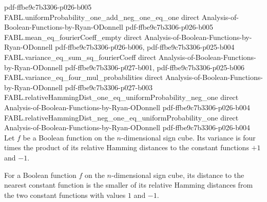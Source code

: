 \begin{theorem}
  {pdf-ffbe9c7b3306-p026-b005}
\proofstep
  {FABL.uniformProbability_one_add_neg_one_eq_one}
  {direct}
  {Analysis-of-Boolean-Functions-by-Ryan-ODonnell}
  {pdf-ffbe9c7b3306-p026-b005}
\proofstep
  {FABL.mean_eq_fourierCoeff_empty}
  {direct}
  {Analysis-of-Boolean-Functions-by-Ryan-ODonnell}
  {pdf-ffbe9c7b3306-p026-b006,
    pdf-ffbe9c7b3306-p025-b004}
\proofstep
  {FABL.variance_eq_sum_sq_fourierCoeff}
  {direct}
  {Analysis-of-Boolean-Functions-by-Ryan-ODonnell}
  {pdf-ffbe9c7b3306-p027-b001,
    pdf-ffbe9c7b3306-p025-b006}
\proofstep
  {FABL.variance_eq_four_mul_probabilities}
  {direct}
  {Analysis-of-Boolean-Functions-by-Ryan-ODonnell}
  {pdf-ffbe9c7b3306-p027-b003}
\proofstep
  {FABL.relativeHammingDist_one_eq_uniformProbability_neg_one}
  {direct}
  {Analysis-of-Boolean-Functions-by-Ryan-ODonnell}
  {pdf-ffbe9c7b3306-p026-b004}
\proofstep
  {FABL.relativeHammingDist_neg_one_eq_uniformProbability_one}
  {direct}
  {Analysis-of-Boolean-Functions-by-Ryan-ODonnell}
  {pdf-ffbe9c7b3306-p026-b004}
Let $f$ be a Boolean function on the $n$-dimensional sign cube. Its variance is four
times the product of its relative Hamming distances to the constant functions $+1$ and
$-1$.
\end{theorem}

\begin{definition}
\label{FABL.distanceToNearestConstant}
\leanok
{}
For a Boolean function $f$ on the $n$-dimensional sign cube, its distance to the nearest
constant function is the smaller of its relative Hamming distances from the two constant
functions with values $1$ and $-1$.
\end{definition}

